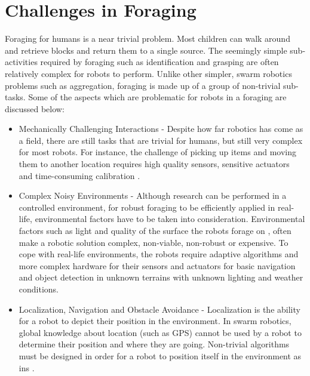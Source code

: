 
\section{Challenges in Foraging}
\label{challengesinforaging}

Foraging for humans is a near trivial problem. Most children can walk around and retrieve blocks and return them to a single source. The seemingly simple sub-activities required by foraging such as identification and grasping are often relatively complex for robots to perform. Unlike other simpler, swarm robotics problems such as aggregation, foraging is made up of a group of non-trivial sub-tasks. Some of the aspects which are problematic for robots in a foraging are discussed below:

\begin{itemize}
\item Mechanically Challenging Interactions - Despite how far robotics has come as a field, there are still tasks that are trivial for humans, but still very complex for most robots. For instance, the challenge of picking up items \cite{saxena2008robotic} and moving them to another location requires high quality sensors, sensitive actuators and time-consuming calibration \cite{mondada2005cooperation}. 

\item Complex Noisy Environments - Although research can be performed in a controlled environment, for robust foraging to be efficiently applied in real-life, environmental factors have to be taken into consideration. Environmental factors such as light \cite{browning2005real,jungel2003real} and quality of the surface the robots forage on \cite{trianni2006cooperative}, often make a robotic solution complex, non-viable, non-robust or expensive. To cope with real-life environments, the robots require adaptive algorithms and more complex hardware for their sensors and actuators for basic navigation and object detection in unknown terrains with unknown lighting and weather conditions. 

\item Localization, Navigation and Obstacle Avoidance - Localization is the ability for a robot to depict their position in the environment. In swarm robotics, global knowledge about location (such as GPS) cannot be used by a robot to determine their position and where they are going. Non-trivial algorithms must be designed in order for a robot to position itself in the environment as ins \cite{zhou2012motion,rothermich2004distributed,arkin1992cooperation}. 

\end{itemize}

